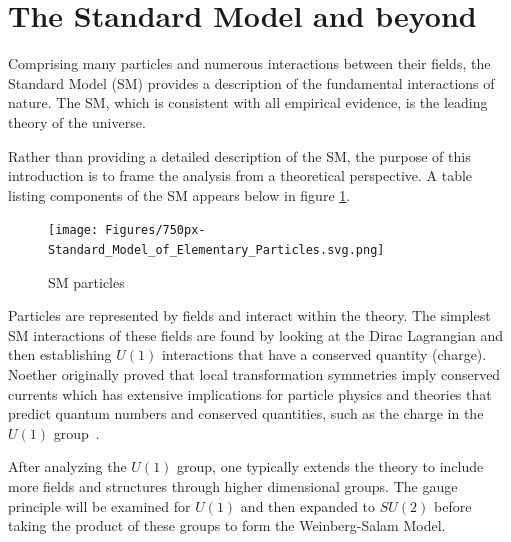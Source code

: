 \section{The Standard Model and beyond}




Comprising many particles and numerous interactions between their fields, the Standard Model (SM) provides a description of the fundamental interactions of nature.
The SM, which is consistent with all empirical evidence, is the leading theory of the universe. 


Rather than providing a detailed description of the SM, the purpose of this introduction is to frame the analysis from a theoretical perspective.
A table listing components of the SM appears below in figure \ref{fig:SM}. 
\begin{figure}[ht!b]
  \centering
  \texttt{[image: Figures/750px-Standard\_Model\_of\_Elementary\_Particles.svg.png]}
  \caption{\label{fig:SM} SM particles }
\end{figure}

Particles are represented by fields and interact within the theory. The simplest SM interactions of these fields are found by looking at the Dirac Lagrangian and then establishing $U(1)$ interactions that have a conserved quantity (charge). 
Noether originally proved that local transformation symmetries imply conserved currents which has extensive implications for particle physics and theories that predict quantum numbers and conserved quantities, such as the charge in the $U(1)$ group~\cite{Noether_1971}. 

After analyzing the $U(1)$ group, one typically extends the theory to include more fields and structures through higher dimensional groups. The gauge principle will be examined for $U(1)$ and then expanded to $SU(2)$ before taking the product of these groups to form the Weinberg-Salam Model.

